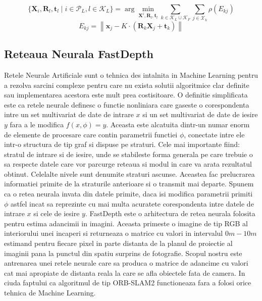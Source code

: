 \documentclass[12pt,a4paper]{report}
\begin{document}
\begin{equation}
\{\mathbf{X}_i, \mathbf{R}_l, \mathbf{t}_l \mid i \in \mathcal{P}_L, l \in \mathcal{K}_L\} = \arg \min_{\mathbf{X}^i, \mathbf{R}_l, \mathbf{t}_l} \sum_{k \in \mathcal{K}_L \cup \mathcal{K}_F} \sum_{j \in \mathcal{X}_k} \rho(E_{kj})
\end{equation}
\begin{equation}  
E_{kj} = \left\| \mathbf{x}_{j} - K \cdot \left(\mathbf{R}_k \mathbf{X}_j + \mathbf{t}_k\right) \right\|
\end{equation}

\subsection{Reteaua Neurala FastDepth}
Retele Neurale Artificiale sunt o tehnica des intalnita in Machine Learning pentru a rezolva 
sarcini complexe pentru care nu exista solutii algoritmice clar definite sau implementarea acestora 
este mult prea costisitoare. O definitie simplificata este ca retele neurale definesc o 
functie nonliniara care gaseste o corespondenta intre un set multivariat de date de intrare \(x\)
si un set multivariat de date de iesire \(y\) fara a le modifica $ f(x, \phi) = y $. Aceasta este
alcatuita dintr-un numar enorm de elemente de procesare care contin parametrii functiei $ \phi $,
conectate intre ele intr-o structura de tip graf si dispuse pe straturi. Cele mai importante fiind: stratul de intrare
si de iesire, unde se stabileste forma generala pe care trebuie o sa respecte datele care vor
parcurge reteaua si modul in care va arata rezultatul obtinut. Celelalte nivele sunt denumite 
straturi ascunse. Aceastea fac prelucrarea informatiei primite de la straturile anterioare 
si o transmit mai departe. Spunem ca o retea neurala invata din datele primite, daca isi 
modifica parametrii primiti $ \phi $ astfel incat sa reprezinte cu mai multa acuratete corespondenta
intre datele de intrare \(x\) si cele de iesire \(y\).
FastDepth este o arhitectura de retea neurala folosita pentru estima adancimii in imagini. 
Aceasta primeste o imagine de tip RGB al interiorului unei incaperi si returneaza o matrice
cu valori in intervalul $0m - 10m$ estimand pentru fiecare pixel in parte distanta de la
planul de proiectie al imaginii pana la punctul din spatiu surprins de fotografie. Scopul nostru
este antrenarea unei retele neurale care sa produca o matrice de adancime cu valori cat mai 
apropiate de distanta reala la care se afla obiectele fata de camera. In ciuda 
faptului ca algoritmul de tip ORB-SLAM2 functioneaza fara a folosi orice tehnica de Machine Learning. 
\end{document}

